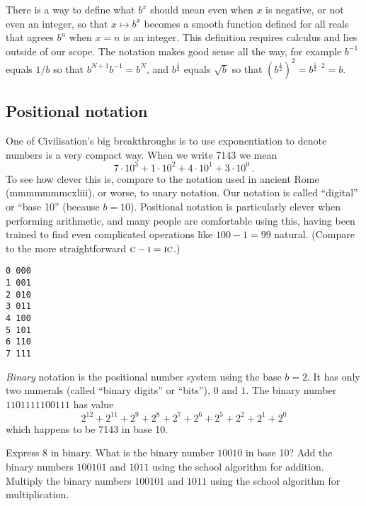 \documentclass{tufte-handout}
\begin{document}
There is a way to define what $b^x$ should mean even when $x$ is
negative, or not even an integer, so that $x\mapsto b^x$ becomes a
smooth function defined for all reals that agrees $b^n$ when $x=n$ is
an integer. This definition requires calculus and lies outside of our
scope.  The notation makes good sense all the way, for example
$b^{-1}$ equals $1/b$ so that $b^{N+1}b^{-1}= b^N$, and
$b^{\frac{1}{2}}$ equals $\sqrt b$ so that $(b^{\frac{1}{2}})^2 =
b^{\frac{1}{2}\cdot 2} = b$.

\subsection{Positional notation}

One of Civilisation's big breakthroughs is to use exponentiation to
denote numbers is a very compact way. When we write 7143 we mean \[
7\cdot 10^3 + 1\cdot 10^2 + 4\cdot 10^1 + 3\cdot 10^0 \,.\]
To see how clever this is, compare to the notation used in ancient Rome
({\sc mmmmmmmcxliii}), or worse, to unary notation. 
Our notation is called ``digital'' or ``base 10'' (because
$b=10$). 
Positional notation is particularly clever when performing
arithmetic, 
and many people are comfortable using this, having been trained to find
even complicated operations like $100-1=99$ natural. (Compare to the
more straightforward $\mbox{\sc c}-\mbox{\sc i} = \mbox{\sc ic}$.)

\begin{marginfigure}
\begin{verbatim}
0 000
1 001
2 010
3 011
4 100
5 101
6 110
7 111
\end{verbatim}
\end{marginfigure}

\emph{Binary} notation is the positional number system using the base
$b=2$.
It has only two numerals (called ``binary
digits'' or ``bits''), $0$ and $1$.
The binary number $1101111100111$ has value 
\[ 2^{12} + 2^{11} + 2^9 + 2^8 + 2^7 +2^6 + 2^5 + 2^2 + 2^1 +2^0   \]
which happens to be 7143 in base 10. 

\begin{ExerciseList}
\Exercise
Express 8 in binary. What is the binary number $10010$ in base 10?
\Exercise Add the binary numbers $100101$ and $1011$ using the
school algorithm for addition.
\Exercise Multiply the binary numbers $100101$ and $1011$ using the school algorithm for multiplication.
\end{ExerciseList}
\end{document}
